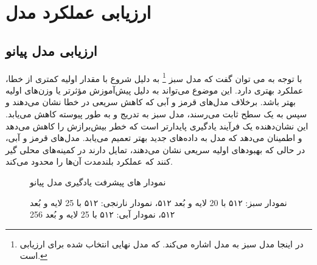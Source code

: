 \section{ارزیابی عملکرد مدل}
\subsection{ارزیابی مدل پیانو}

با توجه به  می توان گفت که مدل سبز \footnote{در اینجا مدل سبز به مدل   اشاره می‌کند. که مدل نهایی انتخاب شده برای ارزیابی است.} به دلیل شروع با مقدار اولیه کمتری از خطا، عملکرد بهتری دارد. این موضوع می‌تواند به دلیل پیش‌آموزش مؤثرتر یا وزن‌های اولیه بهتر باشد. برخلاف مدل‌های قرمز و آبی که کاهش سریعی در خطا نشان می‌دهند و سپس به یک سطح ثابت می‌رسند، مدل سبز به تدریج و به طور پیوسته کاهش می‌یابد. این نشان‌دهنده یک فرآیند یادگیری پایدارتر است که خطر بیش‌برازش را کاهش می‌دهد و اطمینان می‌دهد که مدل به داده‌های جدید بهتر تعمیم می‌یابد. مدل‌های قرمز و آبی، در حالی که بهبودهای اولیه سریعی نشان می‌دهند، تمایل دارند در کمینه‌های محلی گیر کنند که عملکرد بلندمدت آن‌ها را محدود می‌کند.
\begin{figure}%
      \centering
      \qquad
      \caption{نمودار های پیشرفت یادگیری مدل پیانو}%
      \vspace{0.8em}
      \caption*{
            نمودار سبز:  ۵۱۲ با 20 لایه و بُعد ۵۱۲،
            نمودار نارنجی: ۵۱۲ با 25 لایه و بُعد ۵۱۲،
            نمودار آبی:  ۵۱۲ با 25 لایه و بُعد 256
      }
      \label{Fig:lrpi}%
\end{figure}



